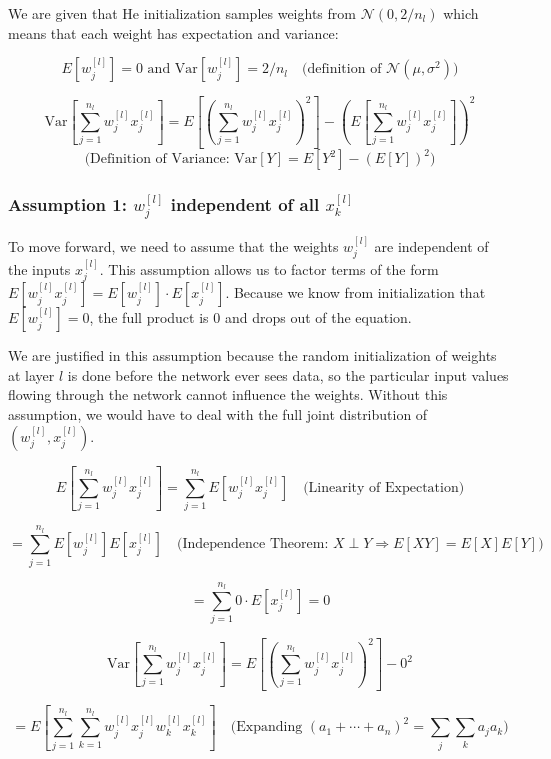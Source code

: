 \documentclass[
  letterpaper,
  DIV=11,
  numbers=noendperiod]{scrartcl}
\begin{document}
We are given that He initialization samples weights from
\(\mathcal{N}(0, 2/n_l)\) which means that each weight has expectation
and variance:

\[E[w_j^{[l]}] = 0 \text{ and } \text{Var}[w_j^{[l]}] = 2/n_l \quad \text{(definition of } \mathcal{N}(\mu, \sigma^2))\]

\[\text{Var}\left[\sum_{j=1}^{n_l} w_j^{[l]} x_j^{[l]}\right] = E\left[\left(\sum_{j=1}^{n_l} w_j^{[l]} x_j^{[l]}\right)^2\right] - \left(E\left[\sum_{j=1}^{n_l} w_j^{[l]} x_j^{[l]}\right]\right)^2\]
\[\text{(Definition of Variance: } \text{Var}[Y] = E[Y^2] - (E[Y])^2)\]

\subsubsection{\texorpdfstring{Assumption 1: \(w_j^{[l]}\) independent
of all
\(x_k^{[l]}\)}{Assumption 1: w\_j\^{}\{{[}l{]}\} independent of all x\_k\^{}\{{[}l{]}\}}}\label{assumption-1-w_jl-independent-of-all-x_kl}

To move forward, we need to assume that the weights \(w_j^{[l]}\) are
independent of the inputs \(x_j^{[l]}\). This assumption allows us to
factor terms of the form
\(E[w_j^{[l]} x_j^{[l]}] = E[w_j^{[l]}] \cdot E[x_j^{[l]}].\) Because we
know from initialization that \(E[w_j^{[l]}] = 0\), the full product is
0 and drops out of the equation.

We are justified in this assumption because the random initialization of
weights at layer \(l\) is done before the network ever sees data, so the
particular input values flowing through the network cannot influence the
weights. Without this assumption, we would have to deal with the full
joint distribution of \((w_j^{[l]}, x_j^{[l]})\).

\[E\left[\sum_{j=1}^{n_l} w_j^{[l]} x_j^{[l]}\right] = \sum_{j=1}^{n_l} E[w_j^{[l]} x_j^{[l]}] \quad \text{(Linearity of Expectation)}\]

\[= \sum_{j=1}^{n_l} E[w_j^{[l]}] E[x_j^{[l]}] \quad \text{(Independence Theorem: } X \perp Y \Rightarrow E[XY] = E[X]E[Y])\]

\[= \sum_{j=1}^{n_l} 0 \cdot E[x_j^{[l]}] = 0\]

\[\text{Var}\left[\sum_{j=1}^{n_l} w_j^{[l]} x_j^{[l]}\right] = E\left[\left(\sum_{j=1}^{n_l} w_j^{[l]} x_j^{[l]}\right)^2\right] - 0^2\]

\[= E\left[\sum_{j=1}^{n_l}\sum_{k=1}^{n_l} w_j^{[l]} x_j^{[l]} w_k^{[l]} x_k^{[l]}\right] \quad \text{(Expanding } (a_1 + \cdots + a_n)^2 = \sum_j \sum_k a_j a_k)\]
\end{document}
